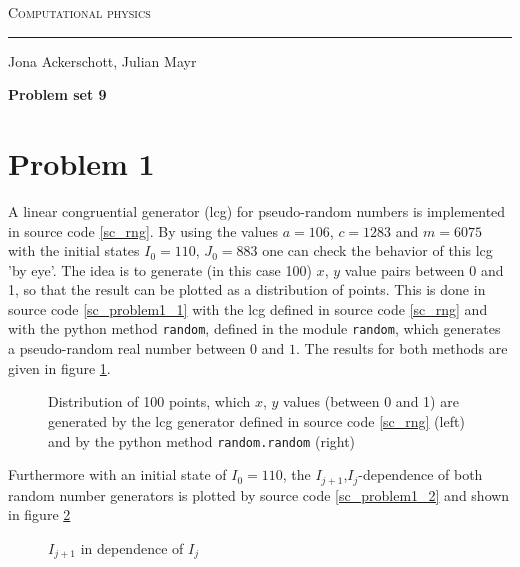 \documentclass[12pt, a4paper]{article}
\begin{document}
  \centerline{\Huge\scshape Computational physics}
  \vspace*{0.5cm}
  \hrule
  \vspace*{0.5cm}
  \centerline{Jona Ackerschott, Julian Mayr}
  \vspace*{1cm}
  \centerline{\Large\bfseries Problem set 9}
  \vspace*{0.5cm}

  \section*{Problem 1}
  A linear congruential generator (lcg) for pseudo-random numbers is implemented in source code \ref{sc_rng}.
  By using the values $a = 106$, $c = 1283$ and $m = 6075$ with the initial states $I_0 = 110$, $J_0 = 883$ one can check the behavior of this lcg 'by eye'.
  The idea is to generate (in this case 100) $x$, $y$ value pairs between 0 and 1, so that the result can be plotted as a distribution of points.
  This is done in source code \ref{sc_problem1_1} with the lcg defined in source code \ref{sc_rng} and with the python method \texttt{random}, defined in the module \texttt{random}, which generates a pseudo-random real number between $0$ and $1$. The results for both methods are given in figure \ref{fig_check_distr}.
  
  \begin{figure}[h]
    \centering
    \begin{minipage}{0.5\textwidth}
      \resizebox{\textwidth}{!} {
        
      } 
    \end{minipage}%
    \begin{minipage}{0.5\textwidth}
      \resizebox{\textwidth}{!} {
        
      }
    \end{minipage}
    \caption{Distribution of 100 points, which $x$, $y$ values (between 0 and 1) are generated by the lcg generator defined in source code \ref{sc_rng} (left) and by the python method \texttt{random.random} (right)}
    \label{fig_check_distr}
  \end{figure}

  Furthermore with an initial state of $I_0 = 110$, the $I_{j+1}$,$I_j$-dependence of both random number generators is plotted by source code \ref{sc_problem1_2} and shown in figure \ref{fig_dependence_from_previous}

  \begin{figure}[h]
    \centering
    \begin{minipage}{0.5\textwidth}
      \resizebox{\textwidth}{!}{
        
      }
    \end{minipage}%
    \begin{minipage}{0.5\textwidth}
      \resizebox{\textwidth}{!}{
        
      }
    \end{minipage}
    \caption{$I_{j+1}$ in dependence of $I_j$ }
    \label{fig_dependence_from_previous}
  \end{figure}
\end{document}
